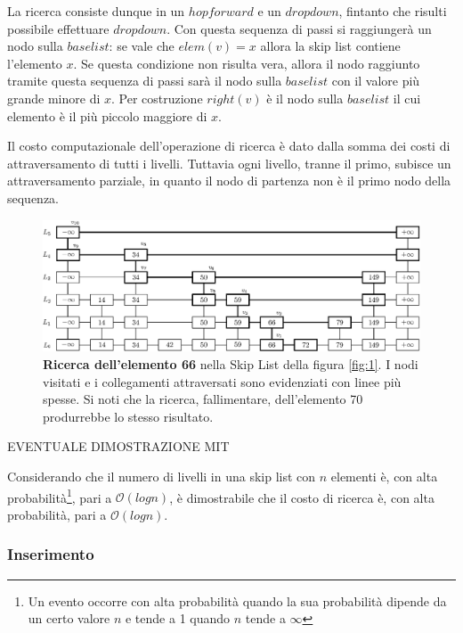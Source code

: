 			La ricerca consiste dunque in un $ hop forward $ e un $ drop down $, fintanto che risulti possibile effettuare $ dropdown $.  Con questa sequenza di passi si raggiungerà un nodo sulla $ base list $: se vale che $ elem(v) = x $ allora la skip list contiene l'elemento $ x $. Se questa condizione non risulta vera, allora il nodo raggiunto tramite questa sequenza di passi sarà il nodo sulla $ base list $ con il valore più grande minore di $ x $. Per costruzione $ right(v) $ è il nodo sulla $ base list $ il cui elemento è il più piccolo maggiore di $ x $.
			
			Il costo computazionale dell'operazione di ricerca è dato dalla somma dei costi di attraversamento di tutti i livelli. Tuttavia ogni livello, tranne il primo, subisce un attraversamento parziale, in quanto il nodo di partenza non è il primo nodo della sequenza.
			
			
			\begin{figure}
				\centering
				\includegraphics[scale=0.6]{figure/search-66.eps}
				\caption{\textbf{Ricerca dell'elemento 66} nella Skip List della figura \ref{fig:1}. I nodi visitati e i collegamenti attraversati sono evidenziati con linee più spesse. Si noti che la ricerca, fallimentare, dell'elemento 70 produrrebbe lo stesso risultato.}\label{fig:2}
			\end{figure}
			
			{EVENTUALE DIMOSTRAZIONE MIT}
			
			Considerando che il numero di livelli in una skip list con $ n $ elementi è, con alta probabilità\footnote{Un evento occorre con alta probabilità quando la sua probabilità dipende da un certo valore $ n $ e tende a 1 quando $ n $ tende a $\infty$}, pari a $\mathcal{O}(log{}n)$, è dimostrabile che il costo di ricerca è, con alta probabilità, pari a $\mathcal{O}(log{}n)$.
				
		\subsubsection{Inserimento}
		
